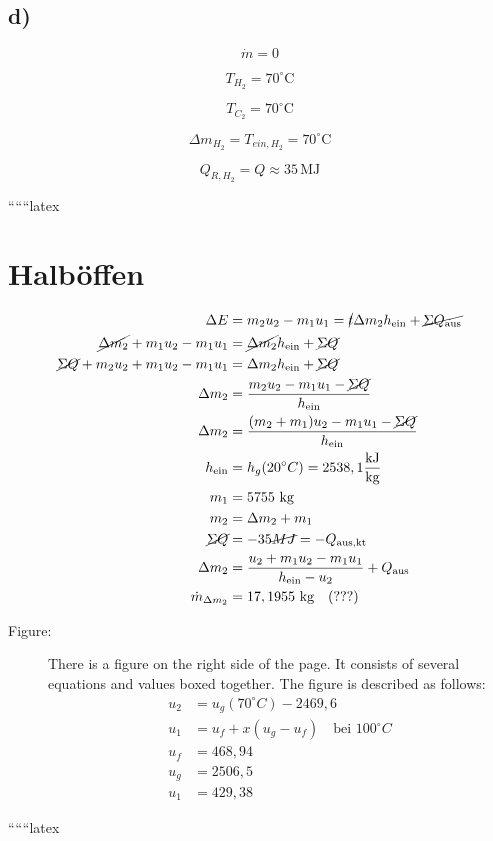 

\subsection*{d)}
\[
\dot{m} = 0
\]

\[
T_{H_2} = 70^\circ \text{C}
\]

\[
T_{C_2} = 70^\circ \text{C}
\]

\[
\Delta m_{H_2} = T_{ein, H_2} = 70^\circ \text{C}
\]

\[
Q_{R, H_2} = Q \approx 35 \, \text{MJ}
\]

``````latex


\section*{Halböffen}

\begin{align*}
\Delta E &= m_2 u_2 - m_1 u_1 = \cancel{t} \Delta m_2 h_{\text{ein}} + \cancel{\Sigma Q_{\text{aus}}} \\
\cancel{\Delta m_2} + m_1 u_2 - m_1 u_1 &= \cancel{\Delta m_2} h_{\text{ein}} + \cancel{\Sigma Q} \\
\cancel{\Sigma Q} + m_2 u_2 + m_1 u_2 - m_1 u_1 &= \Delta m_2 h_{\text{ein}} + \cancel{\Sigma Q} \\
\Delta m_2 &= \frac{m_2 u_2 - m_1 u_1 - \cancel{\Sigma Q}}{h_{\text{ein}}} \\
\Delta m_2 &= \frac{(m_2 + m_1) u_2 - m_1 u_1 - \cancel{\Sigma Q}}{h_{\text{ein}}} \\
h_{\text{ein}} &= h_g(20^\circ C) = 2538,1 \frac{\text{kJ}}{\text{kg}} \\
m_1 &= 5755 \text{ kg} \\
m_2 &= \Delta m_2 + m_1 \\
\cancel{\Sigma Q} &= -35 \cancel{MJ} = -Q_{\text{aus,kt}} \\
\Delta m_2 &= \frac{u_2 + m_1 u_2 - m_1 u_1}{h_{\text{ein}} - u_2} + Q_{\text{aus}} \\
\dot{m}_{\Delta m_2} &= 17,1955 \text{ kg} \quad (\text{???})
\end{align*}

\begin{description}
\item[Figure:] There is a figure on the right side of the page. It consists of several equations and values boxed together. The figure is described as follows:
\begin{align*}
u_2 &= u_g(70^\circ C) - 2469,6 \\
u_1 &= u_f + x (u_g - u_f) \quad \text{bei } 100^\circ C \\
u_f &= 468,94 \\
u_g &= 2506,5 \\
u_1 &= 429,38
\end{align*}
\end{description}

``````latex